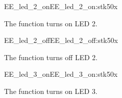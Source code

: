 \begin{function_nopb2}{EE\_led\_2\_on}{EE_led_2_on:stk50x}
  
  \begin{fundescription}
    The function turns on LED 2.
  \end{fundescription}
  
  
  
\end{function_nopb2}

\begin{function_nopb2}{EE\_led\_2\_off}{EE_led_2_off:stk50x}
  
  \begin{fundescription}
    The function turns off LED 2.
  \end{fundescription}
  
  
  
\end{function_nopb2}

\begin{function_nopb2}{EE\_led\_3\_on}{EE_led_3_on:stk50x}
  
  \begin{fundescription}
    The function turns on LED 3.
  \end{fundescription}
  
  
  
\end{function_nopb2}

